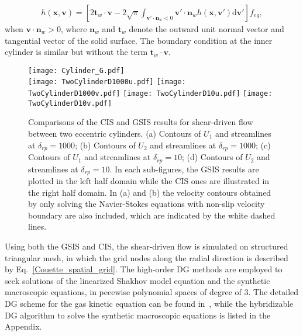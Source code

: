 \begin{equation}
\begin{aligned}
h\left(\bm{x},\bm{v}\right)=\left[2\bm{t}_w\cdot\bm{v}-2\sqrt{\pi}\int_{\bm{v}'\cdot\bm{n}_w<0}\bm{v}'\cdot\bm{n}_wh\left(\bm{x},\bm{v}'\right)\mathrm{d}\bm{v}'\right]f_{eq},
\end{aligned}
\end{equation}
when $\bm{v}\cdot\bm{n}_w>0$,
where $\bm{n}_w$ and $\bm{t}_w$ denote the outward unit normal vector and tangential vector of the solid surface. The boundary condition at the inner cylinder is similar but without the term $\bm{t}_w\cdot\bm{v}$.




\begin{figure}[p]
	\centering
	\texttt{[image: Cylinder\_G.pdf]}\\
	\vskip 0.5cm
	\texttt{[image: TwoCylinderD1000u.pdf]}\hskip 0.5cm
	\texttt{[image: TwoCylinderD1000v.pdf]}
	\vskip 0.5cm
	\texttt{[image: TwoCylinderD10u.pdf]}\hskip 0.5cm
	\texttt{[image: TwoCylinderD10v.pdf]}
	\caption{Comparisons of the CIS and GSIS results for shear-driven flow between two eccentric cylinders. (a) Contours of $U_1$ and streamlines at $\delta_{rp}=1000$; (b) Contours of $U_2$ and streamlines at $\delta_{rp}=1000$; (c) Contours of $U_1$ and streamlines at $\delta_{rp}=10$; (d) Contours of $U_2$ and streamlines at $\delta_{rp}=10$. In each sub-figures, the GSIS results are plotted in the left half domain while the CIS ones are illustrated in the right half domain. In (a) and (b) the velocity contours obtained by only solving the Navier-Stokes equations with non-slip velocity boundary are also included, which are indicated by the white dashed lines.
	}
	\label{TwoCylinderV}
\end{figure}

Using both the GSIS and CIS, the shear-driven flow is simulated on structured triangular mesh, in which the grid nodes along the radial direction is described by Eq.~\eqref{Couette_spatial_grid}. The high-order DG methods are employed to seek solutions of the linearized Shakhov model equation and the synthetic macroscopic equations, in pecewise polynomial spaces of degree of 3. The detailed DG scheme for the gas kinetic equation can be found in~\cite{Su2019IDG}, while the hybridizable DG algorithm to solve the synthetic macroscopic equations is listed in the Appendix. 




